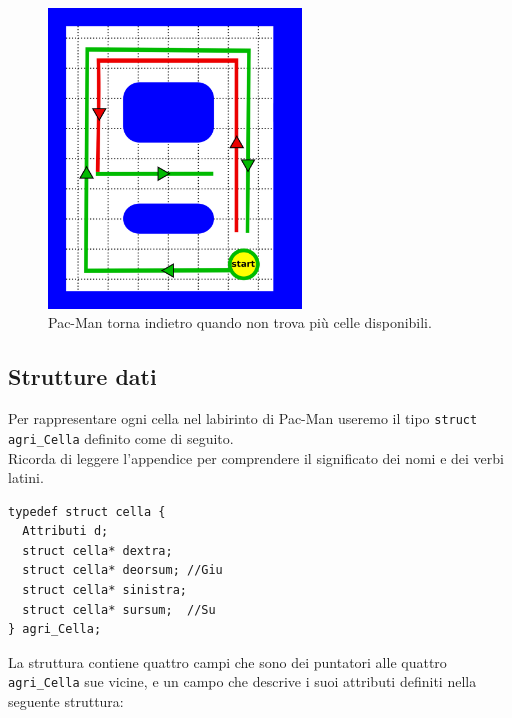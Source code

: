 \documentclass[8pt]{book}
\begin{document}
\begin{figure}
  \centering
  \includegraphics[width=0.6\textwidth]{img/pathBoustr.png}
    \caption{Pac-Man torna indietro quando non trova più celle disponibili.}
  \label{pathBoustr}
\end{figure}

\subsection{Strutture dati}
Per rappresentare ogni cella nel labirinto di Pac-Man useremo il tipo \texttt{struct} \texttt{agri\_Cella} definito come di seguito.\\

Ricorda di leggere l'appendice per comprendere il significato dei nomi e dei verbi latini.\\

  \begin{spacing}{0.9}
    \begin{small}
      \begin{tcolorbox}
\begin{verbatim}
typedef struct cella {
  Attributi d;
  struct cella* dextra;  
  struct cella* deorsum; //Giu
  struct cella* sinistra;
  struct cella* sursum;  //Su
} agri_Cella;
\end{verbatim}
    \end{tcolorbox}
  \end{small}
\end{spacing}

La struttura contiene quattro campi che sono dei puntatori alle quattro \texttt{agri\_Cella} sue vicine, e  un campo che descrive i suoi attributi definiti nella seguente struttura:
\end{document}
